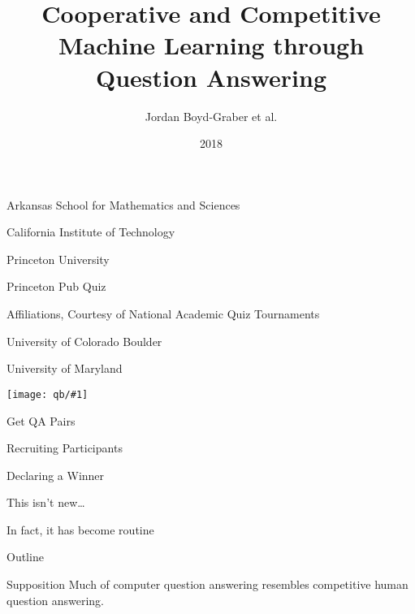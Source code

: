 \documentclass[xcolor=table]{beamer}
\title[HCQA]{Cooperative and Competitive Machine Learning through Question Answering}
\author{ Jordan Boyd-Graber et al.}
\date{2018}
\institute[Maryland] %
{University of Maryland}
\newcommand{\fsi}[2]{
\begin{frame}[plain]
\vspace*{-1pt}
\makebox[\linewidth]{\texttt{[image: \#1]}}
\begin{center}
#2
\end{center}
\end{frame}
}
\newcommand{\gfx}[2]{
\begin{center}
	\texttt{[image: qb/\#1]}
\end{center}
}
\begin{document}


\fsi{qb/asms}{Arkansas School for Mathematics and Sciences}

\fsi{qb/caltech}{California Institute of Technology}

\fsi{qb/princeton}{Princeton University}

\fsi{qb/pub_quiz}{Princeton Pub Quiz}

\fsi{qb/naqt_jbg_1}{Affiliations, Courtesy of National Academic Quiz Tournaments}


\fsi{qb/boulder}{University of Colorado Boulder}

\fsi{qb/maqt}{University of Maryland}

\gfx{final_jeopardy}{1.0}

\fsi{qb/mturk_qa}{Get QA Pairs}

\fsi{qb/mrqa_tweet}{Recruiting Participants}

\fsi{qb/ai2_leaderboard}{Declaring a Winner}

\fsi{qb/byu_college_bowl}{This isn't new\dots}

\fsi{qb/hsnct}{In fact, it has become routine}

\begin{frame}{Outline}

  \begin{block}{Supposition}
    Much of computer question answering resembles competitive human question answering.
  \end{block}

  \only<2>{\gfx{changemymind}{.65}}

  
\end{frame}
\end{document}
